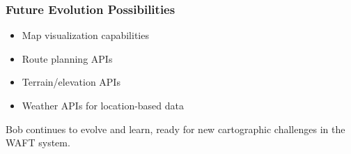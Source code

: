\documentclass[11pt,letterpaper]{article}
\begin{document}
\begin{highlightbox}
\subsubsection*{Future Evolution Possibilities}
\begin{itemize}[leftmargin=*]
    \item Map visualization capabilities
    \item Route planning APIs
    \item Terrain/elevation APIs
    \item Weather APIs for location-based data
\end{itemize}
\end{highlightbox}

Bob continues to evolve and learn, ready for new cartographic challenges in the WAFT system.
\end{document}
